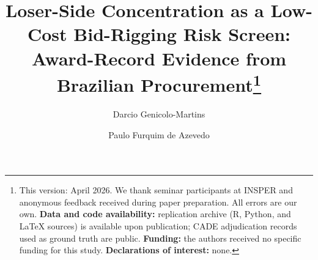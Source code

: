 
\begin{frontmatter}

\title{Loser-Side Concentration as a Low-Cost Bid-Rigging Risk Screen: Award-Record Evidence from Brazilian Procurement\texorpdfstring{\footnote{This version: April 2026. We thank seminar participants at INSPER and anonymous feedback received during paper preparation. All errors are our own. \textbf{Data and code availability:} replication archive (R, Python, and \LaTeX{} sources) is available upon publication; CADE adjudication records used as ground truth are public. \textbf{Funding:} the authors received no specific funding for this study. \textbf{Declarations of interest:} none.}}{}}

\author[insper]{Darcio Genicolo-Martins}
\author[insper]{Paulo Furquim de Azevedo}


\end{frontmatter}
